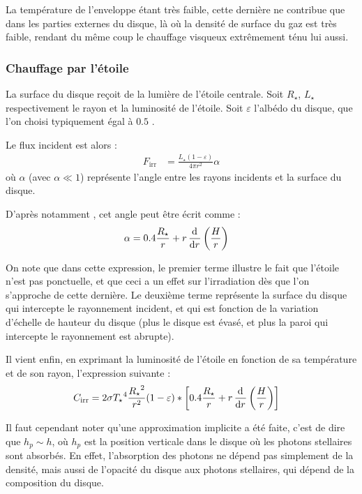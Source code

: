La température de l'enveloppe étant très faible, cette dernière ne contribue que dans les parties externes du disque, là où la densité de surface du gaz est très faible, rendant du même coup le chauffage visqueux extrêmement ténu lui aussi.

\subsubsection{Chauffage par l'étoile}\label{sec:irradiation}
La surface du disque reçoit de la lumière de l'étoile centrale. Soit $R_\star$, $L_\star$ respectivement le rayon et la luminosité de l'étoile. Soit $\varepsilon$ l'albédo du disque, que l'on choisi typiquement égal à $0.5$  \citep{menou2004low}. 

Le flux incident est alors \citep[eq. (7)]{menou2004low} : 
\begin{align}
F_\text{irr} &= \frac{L_\star(1-\varepsilon)}{4\pi r^2} \alpha
\end{align}
où $\alpha$ (avec $\alpha\ll 1$) représente l'angle entre les rayons incidents et la surface du disque. 

D'après notamment \cite[eq. (5)]{chiang1997spectral}, cet angle peut être écrit comme : 
\begin{align}
\alpha &= 0.4 \frac{R_\star}{r} + r \mathinner{ \dfrac{\operatorname{d \!}{^{}}}{\operatorname{d \!}{{r}^{}}} }\left(\frac{H}{r}\right)
\end{align}

On note que dans cette expression, le premier terme illustre le fait que l'étoile n'est pas ponctuelle, et que ceci a un effet sur l'irradiation dès que l'on s'approche de cette dernière. Le deuxième terme représente la surface du disque qui intercepte le rayonnement incident, et qui est fonction de la variation d'échelle de hauteur du disque (plus le disque est évasé, et plus la paroi qui intercepte le rayonnement est abrupte). 

Il vient enfin, en exprimant la luminosité de l'étoile en fonction de sa température et de son rayon, l'expression suivante :
\begin{align}
C_\text{irr} &= 2 \sigma {T_\star}^4 \frac{{R_\star}^2}{r^2} (1-\varepsilon) * \left[0.4 \frac{R_\star}{r} + r \mathinner{ \dfrac{\operatorname{d \!}{^{}}}{\operatorname{d \!}{{r}^{}}} }\left(\frac{H}{r}\right)\right]
\end{align}

Il faut cependant noter qu'une approximation implicite a été faite, c'est de dire que $h_p\sim h$, où $h_p$ est la position verticale dans le disque où les photons stellaires sont absorbés. En effet, l'absorption des photons ne dépend pas simplement de la densité, mais aussi de l'opacité du disque aux photons stellaires, qui dépend de la composition du disque.

